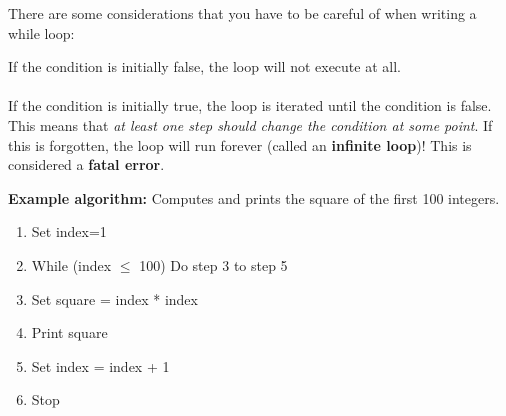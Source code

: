 \documentclass[]{article}
\begin{document}
\noindent There are some considerations that you have to be careful of when writing a while loop:\\
\begin{addmargin}[2em]{0em}
	If the condition is initially false, the loop will not execute at all.\\\\
	If the condition is initially true, the loop is iterated until the condition is false. This means that \textit{at least one step should change the condition at some point}. If this is forgotten, the loop will run forever (called an \textbf{infinite loop})! This is considered a \textbf{fatal error}.\\
\end{addmargin}

\noindent \textbf{Example algorithm:} Computes and prints the square of the first 100 integers.
\begin{enumerate}
	\item Set index=1
	\item While (index $\leq$ 100) Do step 3 to step 5\setlength{\itemindent}{0.5cm}
		\item Set square = index * index
		\item Print square
		\item Set index = index + 1
	\setlength{\itemindent}{0cm}\item Stop\smallskip
\end{enumerate}
\end{document}
